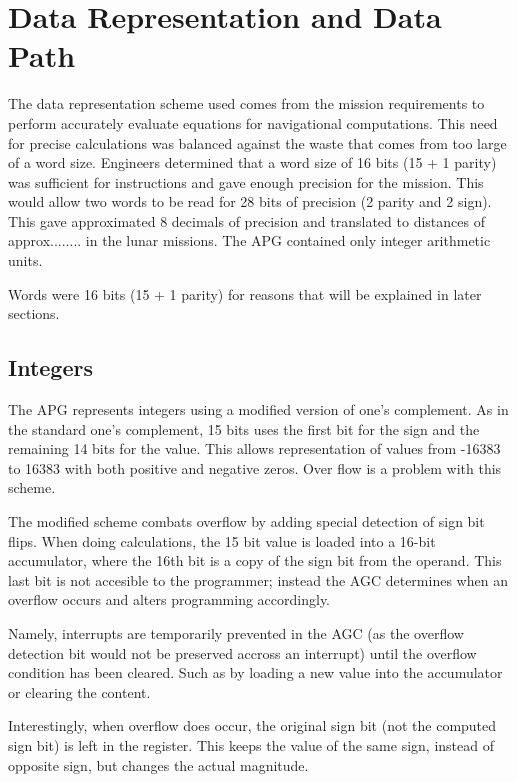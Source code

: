 \documentclass[a4paper,11pt]{article}
\begin{document}

\section{Data Representation and Data Path}
The data representation scheme used comes from the mission requirements to perform accurately evaluate equations for navigational computations.  This need for precise calculations was balanced against the waste that comes from too large of a word size.  Engineers determined that a word size of 16 bits (15 + 1 parity) was sufficient for instructions and gave enough precision for the mission.  This would allow two words to be read for 28 bits of precision (2 parity and 2 sign).  This gave approximated 8 decimals of precision and translated to distances of approx........ in the lunar missions.
The APG contained only integer arithmetic units.

Words were 16 bits (15 + 1 parity) for reasons that will be explained in later sections.  

\subsection{Integers}
The APG represents integers using a modified version of one's complement. As in the standard one's complement, 15 bits uses the first bit for the sign and the remaining 14 bits for the value.  This allows representation of values from -16383 to 16383 with both positive and negative zeros. Over flow is a problem with this scheme.

The modified scheme combats overflow by adding special detection of sign bit flips.  When doing calculations, the 15 bit value is loaded into a 16-bit accumulator, where the 16th bit is a copy of the sign bit from the operand.  This last bit is not accesible to the programmer; instead the AGC determines when an overflow occurs and alters programming accordingly.  

Namely, interrupts are temporarily prevented in the AGC (as the overflow detection bit would not be preserved accross an interrupt) until the overflow condition has been cleared.  Such as by loading a new value into the accumulator or clearing the content.  

Interestingly, when overflow does occur, the original sign bit (not the computed sign bit) is left in the register.  This keeps the value of the same sign, instead of opposite sign, but changes the actual magnitude.  
\end{document}
